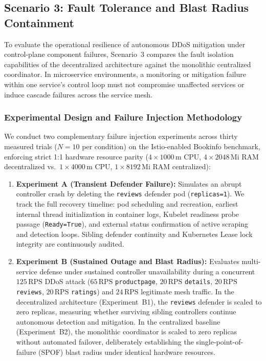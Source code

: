 
\subsection{Scenario 3: Fault Tolerance and Blast Radius Containment}
\label{sec:scenario3_fault_tolerance}

To evaluate the operational resilience of autonomous DDoS mitigation under control-plane component failures, Scenario~3 compares the fault isolation capabilities of the decentralized architecture against the monolithic centralized coordinator. In microservice environments, a monitoring or mitigation failure within one service's control loop must not compromise unaffected services or induce cascade failures across the service mesh.

\subsubsection{Experimental Design and Failure Injection Methodology}
We conduct two complementary failure injection experiments across thirty measured trials ($N=10$ per condition) on the Istio-enabled Bookinfo benchmark, enforcing strict 1:1 hardware resource parity ($4 \times 1000\,\text{m}$ CPU, $4 \times 2048\,\text{Mi}$ RAM decentralized vs.\ $1 \times 4000\,\text{m}$ CPU, $1 \times 8192\,\text{Mi}$ RAM centralized):

\begin{enumerate}
    \item \textbf{Experiment A (Transient Defender Failure):} Simulates an abrupt controller crash by deleting the \texttt{reviews} defender pod (\texttt{replicas=1}). We track the full recovery timeline: pod scheduling and recreation, earliest internal thread initialization in container logs, Kubelet readiness probe passage (\texttt{Ready=True}), and external status confirmation of active scraping and detection loops. Sibling defender continuity and Kubernetes Lease lock integrity are continuously audited.
    \item \textbf{Experiment B (Sustained Outage and Blast Radius):} Evaluates multi-service defense under sustained controller unavailability during a concurrent $125\,\text{RPS}$ DDoS attack ($65\,\text{RPS}$ \texttt{productpage}, $20\,\text{RPS}$ \texttt{details}, $20\,\text{RPS}$ \texttt{reviews}, $20\,\text{RPS}$ \texttt{ratings}) and $24\,\text{RPS}$ legitimate mesh traffic. In the decentralized architecture (Experiment~B1), the \texttt{reviews} defender is scaled to zero replicas, measuring whether surviving sibling controllers continue autonomous detection and mitigation. In the centralized baseline (Experiment~B2), the monolithic coordinator is scaled to zero replicas without automated failover, deliberately establishing the single-point-of-failure (SPOF) blast radius under identical hardware resources.
\end{enumerate}

